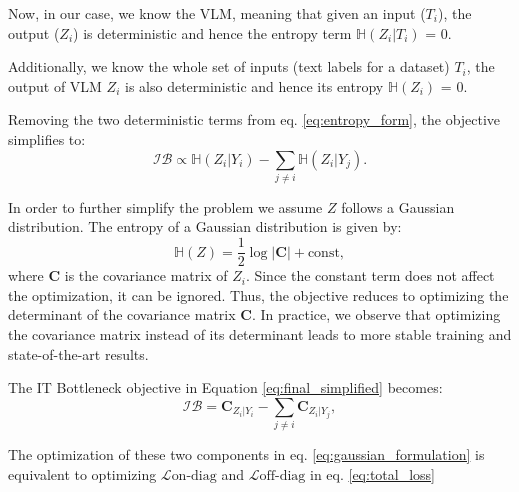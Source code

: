 Now, in our case, we know the VLM, meaning that given an input ($T_i$), the  output ($Z_i$) is deterministic and hence the entropy term 
$\mathbb{H}(Z_i | T_i)$ = 0. 

Additionally, we know the whole set of inputs (text labels for a dataset) $T_i$, the output of VLM $Z_i$ is also deterministic and hence its entropy $\mathbb{H}(Z_i)$ = 0.

Removing the two deterministic terms from eq. \ref{eq:entropy_form}, the objective simplifies to:
\begin{equation} \mathcal{IB} \propto \mathbb{H}(Z_i | Y_i) - \sum_{j \neq i} \mathbb{H}(Z_i | Y_j).
\label{eq:final_simplified} \end{equation}

In order to further simplify the problem we assume $Z$ follows a Gaussian distribution. The entropy of a Gaussian distribution is given by:
\begin{equation} \mathbb{H}(Z) = \frac{1}{2} \log \left|\mathbf{C}\right| + \text{const},
\label{eq:gaussian_entropy} \end{equation}
where $\mathbf{C}$ is the covariance matrix of $Z_i$. Since the constant term does not affect the optimization, it can be ignored. Thus, the objective reduces to optimizing the determinant of the covariance matrix $\mathbf{C}$. In practice, we observe that optimizing the covariance matrix instead of its determinant leads to more stable training and state-of-the-art results.

The IT Bottleneck objective in Equation \ref{eq:final_simplified} becomes:
\begin{equation} \mathcal{IB} = \mathbf{C}_{Z_i | Y_i} - \sum_{j \neq i} \mathbf{C}_{Z_i | Y_j},
\label{eq:gaussian_formulation} \end{equation}

The optimization of these two components in eq. \ref{eq:gaussian_formulation} is equivalent to optimizing $\mathcal{L}{\text{on-diag}}$ and $\mathcal{L}{\text{off-diag}}$ in eq. \ref{eq:total_loss}




